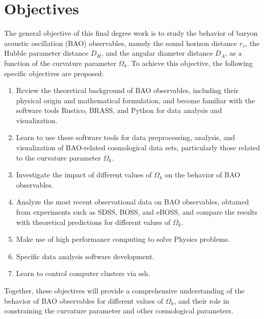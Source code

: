 \chapter{Objectives}
The general objective of this final degree work is to study the behavior of baryon acoustic oscillation (BAO) observables, namely the sound horizon distance $r_s$, the Hubble parameter distance $D_H$, and the angular diameter distance $D_A$, as a function of the curvature parameter $\Omega_k$. To achieve this objective, the following specific objectives are proposed:

\begin{enumerate}
  \item Review the theoretical background of BAO observables, including their physical origin and mathematical formulation, and become familiar with the software tools Rustico, BRASS, and Python for data analysis and visualization.
  \item Learn to use these software tools for data preprocessing, analysis, and visualization of BAO-related cosmological data sets, particularly those related to the curvature parameter $\Omega_k$.
  \item Investigate the impact of different values of $\Omega_k$ on the behavior of BAO observables.
  \item Analyze the most recent observational data on BAO observables, obtained from experiments such as SDSS, BOSS, and eBOSS, and compare the results with theoretical predictions for different values of $\Omega_k$.
	\item Make use of high performance computing to solve Physics problems.
  \item Specific data analysis software development.
  \item Learn to control computer clusters via ssh.
\end{enumerate}
Together, these objectives will provide a comprehensive understanding of the behavior of BAO observables for different values of $\Omega_k$, and their role in constraining the curvature parameter and other cosmological parameters.




